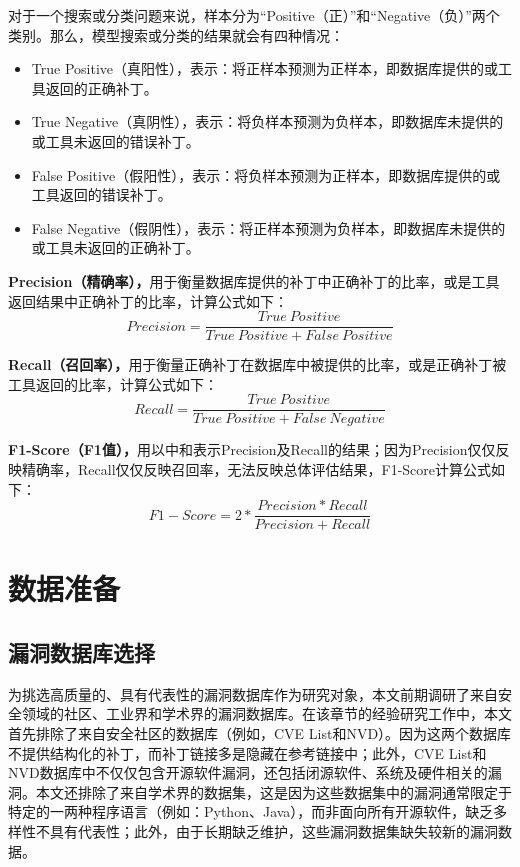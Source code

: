 对于一个搜索或分类问题来说，样本分为“Positive（正）”和“Negative（负）”两个类别。那么，模型搜索或分类的结果就会有四种情况：
\begin{itemize}
    \item True Positive（真阳性），表示：将正样本预测为正样本，即数据库提供的或工具返回的正确补丁。
    \item True Negative（真阴性），表示：将负样本预测为负样本，即数据库未提供的或工具未返回的错误补丁。
    \item False Positive（假阳性），表示：将负样本预测为正样本，即数据库提供的或工具返回的错误补丁。
    \item False Negative（假阴性），表示：将正样本预测为负样本，即数据库未提供的或工具未返回的正确补丁。
\end{itemize}

\textbf{Precision（精确率），}用于衡量数据库提供的补丁中正确补丁的比率，或是工具返回结果中正确补丁的比率，计算公式如下：
\begin{equation}\label{eq:precision}
    Precision=\frac{True\ Positive}{True\ Positive + False\ Positive} 
\end{equation}

\textbf{Recall（召回率），}用于衡量正确补丁在数据库中被提供的比率，或是正确补丁被工具返回的比率，计算公式如下：
\begin{equation}\label{eq:recall}
    Recall=\frac{True\ Positive}{True\ Positive + False\ Negative} 
\end{equation}

\textbf{F1-Score（F1值），}用以中和表示Precision及Recall的结果；因为Precision仅仅反映精确率，Recall仅仅反映召回率，无法反映总体评估结果，F1-Score计算公式如下：
\begin{equation}\label{eq:f1}
    F1-Score=2*\frac{Precision*Recall}{Precision + Recall} 
\end{equation}

\section{数据准备}\label{sec:preparation}
\subsection{漏洞数据库选择}
为挑选高质量的、具有代表性的漏洞数据库作为研究对象，本文前期调研了来自安全领域的社区、工业界和学术界的漏洞数据库。在该章节的经验研究工作中，本文首先排除了来自安全社区的数据库（例如，CVE List和NVD）。因为这两个数据库不提供结构化的补丁，而补丁链接多是隐藏在参考链接中；此外，CVE List和NVD数据库中不仅仅包含开源软件漏洞，还包括闭源软件、系统及硬件相关的漏洞。本文还排除了来自学术界的数据集\cite{ponta2019manually,fan2020ac,jimenez2018enabling,gkortzis2018vulinoss,namrud2019androvul,li2017large,liu2020large,antal2020exploring}，这是因为这些数据集中的漏洞通常限定于特定的一两种程序语言（例如：Python、Java），而非面向所有开源软件，缺乏多样性不具有代表性；此外，由于长期缺乏维护，这些漏洞数据集缺失较新的漏洞数据。


